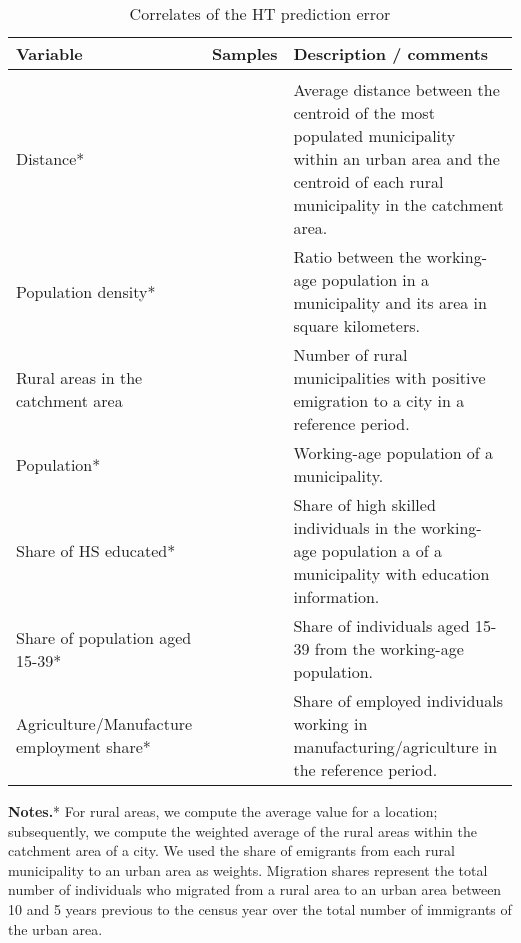 \begin{sidewaystable}[htbp]


  \caption{Correlates of the HT prediction error}
    \begin{tabular}{p{14.445em}rp{37.89em}}
    \multicolumn{1}{l}{\textbf{Variable}} & \multicolumn{1}{l}{\textbf{Samples}} & \multicolumn{1}{l}{\textbf{Description / comments}} \\
    \midrule
    \multicolumn{1}{r}{} &       & \multicolumn{1}{r}{} \\

  Distance* &       & Average distance between the centroid of the most populated municipality within an urban area and the centroid of each rural municipality in the catchment area.  \\
    Population density* &       & Ratio between the working-age population in a municipality and its area in square kilometers. \\
    Rural areas in the catchment area &       & Number of rural municipalities with positive emigration to a city in a reference period. \\
    Population* &       & Working-age population of a municipality. \\
    Share of HS educated* &       & Share of high skilled individuals in the working-age population a of a municipality with education information. \\
    Share of population aged 15-39* &       & Share of individuals aged 15-39 from the working-age population. \\
    Agriculture/Manufacture employment share* &       & Share of employed individuals working in manufacturing/agriculture in the reference period. \\

    \bottomrule

    \end{tabular}%
  \label{tab:addlabel}%
 \begin{tablenotes}
			\footnotesize \textbf{Notes.}*  For rural areas, we compute the average value for a location; subsequently, we compute the weighted average of the rural areas within the catchment area of a city.  We used the share of emigrants from each rural municipality to an urban area as weights.  Migration shares represent the total number of individuals who migrated from a rural area to an urban area between 10 and 5 years previous to the census year over the total number of immigrants of the urban area.


			\end{tablenotes}

\end{sidewaystable}%
